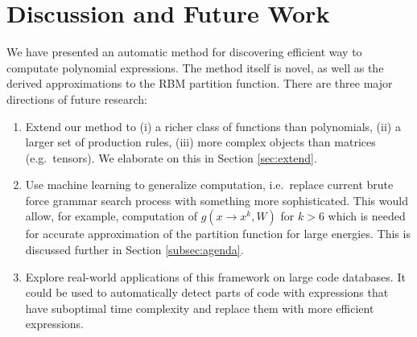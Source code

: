 \section{Discussion and Future Work}

We have presented an automatic method for discovering efficient way to
computate polynomial expressions. The method itself is novel, as well as the derived
approximations to the RBM partition function. There are three
major directions of future research: 

\begin{enumerate}
  \item Extend our method to (i) a richer class of functions
    than polynomials, (ii) a larger set of production rules, (iii) more complex
    objects than matrices (e.g.~tensors). We elaborate on this in
    Section \ref{sec:extend}.

  \item Use machine learning to generalize computation, i.e.~replace 
    current brute force grammar search process with something more
    sophisticated. This would allow, for example, computation of
$g(x \rightarrow x^k, W)$ for $k > 6$ which is needed for accurate
approximation of the partition function for large energies. This is discussed further in
Section \ref{subsec:agenda}.



\item Explore real-world applications of this framework on large code databases. 
  It could be used to automatically detect parts of code with expressions that have suboptimal 
  time complexity and replace them with more efficient expressions.
\end{enumerate}




